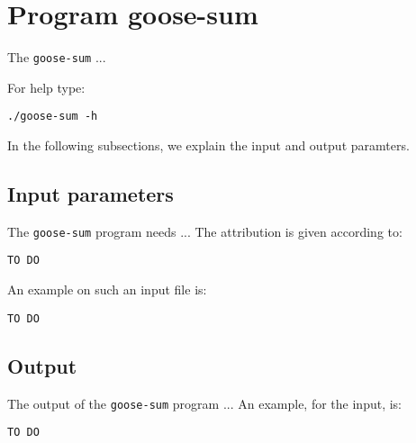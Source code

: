\section{Program goose-sum}
The \texttt{goose-sum} ...

For help type:
\begin{lstlisting}
./goose-sum -h
\end{lstlisting}
In the following subsections, we explain the input and output paramters.

\subsection*{Input parameters}

The \texttt{goose-sum} program needs ...
The attribution is given according to:
\begin{lstlisting}
TO DO
\end{lstlisting}

An example on such an input file is:
\begin{lstlisting}
TO DO
\end{lstlisting}

\subsection*{Output}
The output of the \texttt{goose-sum} program ...
An example, for the input, is:
\begin{lstlisting}
TO DO
\end{lstlisting}
